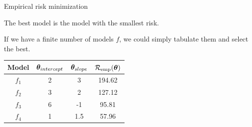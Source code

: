 \documentclass[11pt,compress,t,notes=noshow, xcolor=table]{beamer}
\begin{document}
\begin{vbframe}{Empirical risk minimization}

The best model is the model with the smallest risk.

\lz

If we have a finite number of models $f$, we could simply tabulate them
and select the best.


\begin{center}
\begin{tabular}{ c | c | c || c }
 Model & \(\displaystyle \bm{\theta}_{intercept} \) & \(\displaystyle \bm{\theta}_{slope} \) & \(\displaystyle \mathcal{R}_{\text{emp}}(\bm{\theta}) \) \\
 \hline
\(\displaystyle f_1 \)   & 2 & 3 & 194.62 \\
\(\displaystyle f_2 \)   & 3 & 2 & 127.12 \\
\(\displaystyle f_3 \)   & 6 & -1 & 95.81 \\
\rowcolor{lightgray}
\(\displaystyle f_4 \)   & 1 & 1.5 & 57.96 \\
\end{tabular}
\end{center}


\end{vbframe}
\end{document}
